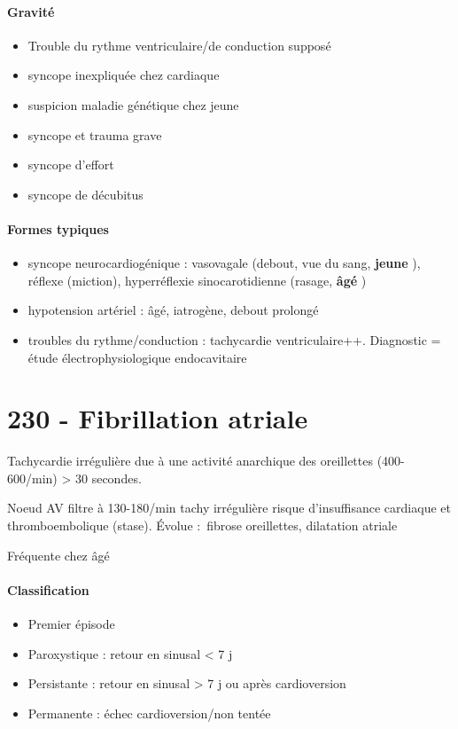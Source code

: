 \paragraph{Gravité}
\begin{itemize}
  \item Trouble du rythme ventriculaire/de conduction supposé
  \item syncope inexpliquée chez cardiaque
  \item suspicion maladie génétique chez jeune
  \item syncope et trauma grave
  \item syncope d'effort
  \item syncope de décubitus
\end{itemize}

\paragraph{Formes typiques}
\begin{itemize}
  \item syncope neurocardiogénique : vasovagale (debout, vue du sang,
    \textbf{jeune} ), réflexe
    (miction), hyperréflexie sinocarotidienne (rasage, \textbf{âgé} )
  \item hypotension artériel : âgé, iatrogène, debout prolongé
  \item troubles du rythme/conduction : tachycardie
    ventriculaire++. Diagnostic = étude électrophysiologique endocavitaire
\end{itemize}

\section{230 - Fibrillation atriale}%
\label{sec:230_fibrillation_atriale}

Tachycardie irrégulière due à une activité anarchique des oreillettes
(400-600/min) > 30 secondes.

Noeud AV filtre à 130-180/min \thus tachy irrégulière \thus risque
d'insuffisance cardiaque et thromboembolique (stase). Évolue : fibrose
oreillettes, dilatation atriale

Fréquente chez âgé

\paragraph{Classification}
\begin{itemize}
  \item Premier épisode
  \item Paroxystique : retour en sinusal < 7 j
  \item Persistante :  retour en sinusal > 7 j ou après cardioversion
  \item Permanente : échec cardioversion/non tentée
\end{itemize}

